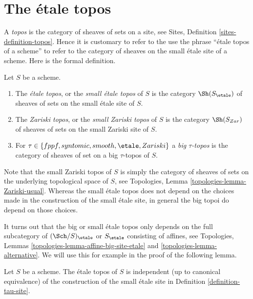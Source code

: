 \section{The \'etale topos}
\label{section-etale-topos}

\noindent
A {\it topos} is the category of sheaves of sets on a site, see
Sites, Definition \ref{sites-definition-topos}. Hence it is customary
to refer to the use the phrase ``\'etale topos of a scheme'' to refer to
the category of sheaves on the small \'etale site of a scheme.
Here is the formal definition.

\begin{definition}
\label{definition-etale-topos}
Let $S$ be a scheme.
\begin{enumerate}
\item The {\it \'etale topos}, or the {\it small \'etale topos}
of $S$ is the category $\Sh(S_\etale)$ of sheaves of sets on
the small \'etale site of $S$.
\item The {\it Zariski topos}, or the {\it small Zariski topos}
of $S$ is the category $\Sh(S_{Zar})$ of sheaves of sets on the
small Zariski site of $S$.
\item For $\tau \in \{fppf, syntomic, smooth, \etale, Zariski\}$ a
{\it big $\tau$-topos} is the category of sheaves of set on a
big $\tau$-topos of $S$.
\end{enumerate}
\end{definition}

\noindent
Note that the small Zariski topos of $S$ is simply the category of sheaves
of sets on the underlying topological space of $S$, see
Topologies, Lemma \ref{topologies-lemma-Zariski-usual}.
Whereas the small \'etale topos does not depend on the choices made in the
construction of the small \'etale site, in general the big topoi do depend
on those choices.

\medskip\noindent
It turns out that the big or small \'etale topos only depends on the
full subcategory of $(\Sch/S)_\etale$ or $S_\etale$ consisting of
affines, see
Topologies, Lemmas \ref{topologies-lemma-affine-big-site-etale} and
\ref{topologies-lemma-alternative}.
We will use this for example in the proof of the following lemma.

\begin{lemma}
\label{lemma-etale-topos-independent-partial-universe}
Let $S$ be a scheme. The \'etale topos of $S$ is independent
(up to canonical equivalence) of the construction of the small
\'etale site in Definition \ref{definition-tau-site}.
\end{lemma}

